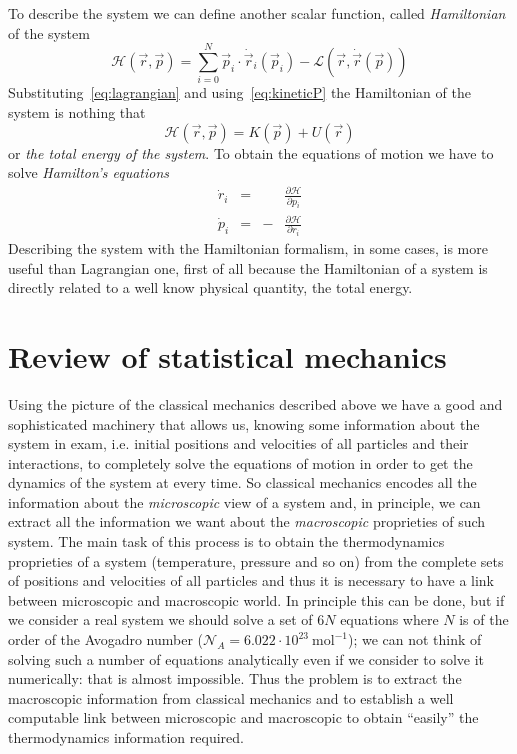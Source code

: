 To describe the system we can define another scalar function, called \textit{Hamiltonian} of the system
\begin{equation*}
	\mathcal{H}(\vec r, \vec p) = \sum_{i=0}^N \vec p_i \cdot \dot{\vec r}_i(\vec p_i) - \mathcal{L}(\vec r, \dot{\vec r}(\vec p))
\end{equation*}
Substituting~\eqref{eq:lagrangian} and using~\eqref{eq:kineticP} the Hamiltonian of the system is nothing that
\begin{equation}
	\mathcal{H}(\vec r, \vec p) = K(\vec p) + U(\vec r)
	\label{eq:hamiltonian}
\end{equation}
or \textit{the total energy of the system}. To obtain the equations of motion we have to solve \textit{Hamilton's equations}
\begin{equation}
	\begin{aligned}
		\dot r_i &=& &\frac{\partial\mathcal{H}}{\partial p_{i}} \\
		\dot p_i &=&-&\frac{\partial\mathcal{H}}{\partial r_{i}}
	\end{aligned}
	\label{eq:eqhamilton}
\end{equation}
Describing the system with the Hamiltonian formalism, in some cases, is more useful than Lagrangian one, first of
all because the Hamiltonian of a system is directly related to a well know physical quantity, the total energy.

\section{Review of statistical mechanics}
\label{sec:statmec}
Using the picture of the classical mechanics described above we have a good and sophisticated machinery that allows us, knowing some information about the system in exam, i.e. initial positions and velocities of all particles and their interactions, to completely solve the equations of motion in order to get the dynamics of the system at every time. So classical mechanics encodes all the information about the \textit{microscopic} view of a system and, in principle, we can extract all the information we want about the \textit{macroscopic} proprieties of such system.
The main task of this process is to obtain the thermodynamics proprieties of a system (temperature, pressure and so on) from the complete sets of positions and velocities of all particles and thus it is necessary to have a link between microscopic and macroscopic world. In principle this can be done, but if we consider a real system we should solve a set of $6N$ equations where $N$ is of the order of the Avogadro number ($\mathcal{N}_A = 6.022 \cdot 10^{23}~\text{mol}^{-1}$); we can not think of solving such a number of equations analytically even if we consider to solve it numerically: that is almost impossible. Thus the problem is to extract the macroscopic information from classical mechanics and to establish a well computable link between microscopic and macroscopic to obtain ``easily'' the thermodynamics information required.

